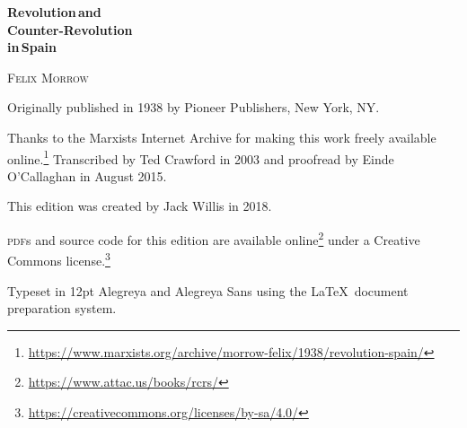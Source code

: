 \begin{titlepage}
	\setlength{\parindent}{0pt}
	
	\vspace*{\fill}
	
	{\sffamily\bfseries\fontsize{42}{42}\selectfont
		Revolution\,\textmd{and} \\
		Counter-Revolution \\
		\textmd{in}\,Spain
		\par}
	
	\vspace{63pt}
	
	{\fontsize{21}{21}\selectfont
		\textsc{Felix Morrow}
		\par}
	
	\vspace*{\fill}
	
\end{titlepage}

{
	\thispagestyle{empty}
	\setlength{\parindent}{0em}
	\setlength{\parskip}{0.5em}
	\sloppy
	
	\vspace*{\fill}
	\vspace*{\fill}
	
	Originally published in 1938 by Pioneer Publishers, New York, NY.
	
	Thanks to the Marxists Internet Archive
	for making this work freely available online.\footnote{\href{https://www.marxists.org/archive/morrow-felix/1938/revolution-spain/}{https://www.marxists.org/archive/morrow-felix/1938/revolution-spain/}}
	Transcribed by Ted Crawford in 2003
	and proofread by Einde O’Callaghan in August 2015.
	
	This edition was created by Jack Willis in 2018.
	
	\textsc{pdf}s and source code for this edition are available online\footnote{\href{https://www.attac.us/books/rcrs/}{https://www.attac.us/books/rcrs/}}
	under a Creative Commons license.\footnote{\href{https://creativecommons.org/licenses/by-sa/4.0/}{https://creativecommons.org/licenses/by-sa/4.0/}}
	
	Typeset in 12pt Alegreya and {\AlegreyaSans Alegreya Sans} using the \LaTeX\ document preparation system.
	
	\vspace*{\fill}
}